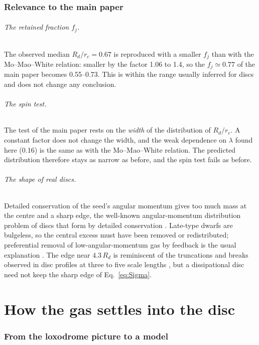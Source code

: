 \documentclass[11pt,a4paper]{article}
\newcommand{\rc}{r_c}
\begin{document}
\section{Relevance to the main paper}

\paragraph{The retained fraction $f_j$.} The observed median
$R_d/\rc=0.67$ is reproduced with a smaller $f_j$ than with the
Mo--Mao--White relation: smaller by the factor 1.06 to 1.4, so the
$f_j\simeq0.77$ of the main paper becomes 0.55--0.73. This is within the
range usually inferred for discs and does not change any conclusion.

\paragraph{The spin test.} The test of the main paper rests on the
\emph{width} of the distribution of $R_d/\rc$. A constant factor does not
change the width, and the weak dependence on $\lambda$ found here (0.16)
is the same as with the Mo--Mao--White relation. The predicted
distribution therefore stays as narrow as before, and the spin test
fails as before.

\paragraph{The shape of real discs.} Detailed conservation of the seed's
angular momentum gives too much mass at the centre and a sharp edge,
the well-known angular-momentum distribution problem of discs that form
by detailed conservation \citep{Dalcanton1997,Bullock2001,vandenBosch2001}.
Late-type dwarfs are bulgeless, so the central excess must have been
removed or redistributed; preferential removal of low-angular-momentum
gas by feedback is the usual explanation
\citep{Governato2010,Brook2011}. The edge near $4.3\,R_d$ is reminiscent
of the truncations and breaks observed in disc profiles at three to five
scale lengths \citep{vanderKruit1979,Pohlen2006}, but a dissipational
disc need not keep the sharp edge of Eq.~\eqref{eq:Sigma}.


\part{How the gas settles into the disc}

\section{From the loxodrome picture to a model}
\end{document}
